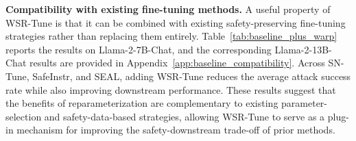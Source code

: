 \documentclass{article}
\begin{document}
\textbf{Compatibility with existing fine-tuning methods.}
A useful property of WSR-Tune is that it can be combined with existing safety-preserving fine-tuning strategies rather than replacing them entirely. Table~\ref{tab:baseline_plus_warp} reports the results on Llama-2-7B-Chat, and the corresponding Llama-2-13B-Chat results are provided in Appendix~\ref{app:baseline_compatibility}. Across SN-Tune, SafeInstr, and SEAL, adding WSR-Tune reduces the average attack success rate while also improving downstream performance.  These results suggest that the benefits of reparameterization are complementary to existing parameter-selection and safety-data-based strategies, allowing WSR-Tune to serve as a plug-in mechanism for improving the safety-downstream trade-off of prior methods.
\end{document}
